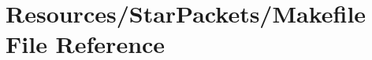 \hypertarget{Resources_2StarPackets_2Makefile}{\section{Resources/\-Star\-Packets/\-Makefile File Reference}
\label{Resources_2StarPackets_2Makefile}
}
